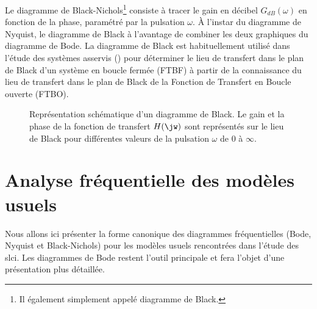 Le diagramme de Black-Nichols\footnote{Il également simplement appelé diagramme 
de Black.} consiste à tracer le gain en décibel $G_{dB}(\omega)$ en fonction de 
la phase, paramétré par la pulsation $\omega$. À l'instar du diagramme de 
Nyquist, le diagramme de Black à l'avantage de combiner les deux graphiques 
du diagramme de Bode. La diagramme de Black est habituellement utilisé dans 
l'étude des systèmes asservis () pour déterminer le lieu 
de transfert dans le plan de Black d'un système en boucle fermée (FTBF) à 
partir de la connaissance du lieu de transfert dans le plan de Black de la 
Fonction de Transfert en Boucle ouverte (FTBO).

\begin{figure}[!h]
    \centering
    
    \caption{Représentation schématique d'un diagramme de Black. Le gain et 
             la phase de la fonction de transfert $H(\jw)$ sont représentés sur
             le lieu de Black pour différentes valeurs de la pulsation $\omega$
             de 0 à $\infty$.\label{fig-sche_black}}
\end{figure}

\newpage
\section{Analyse fréquentielle des modèles usuels}

Nous allons ici présenter la forme canonique des diagrammes fréquentielles 
(Bode, Nyquist et Black-Nichols) pour les modèles usuels rencontrées dans 
l'étude des \gls{slci}. Les diagrammes de Bode restent l'outil principale et 
fera l'objet d'une présentation plus détaillée.
